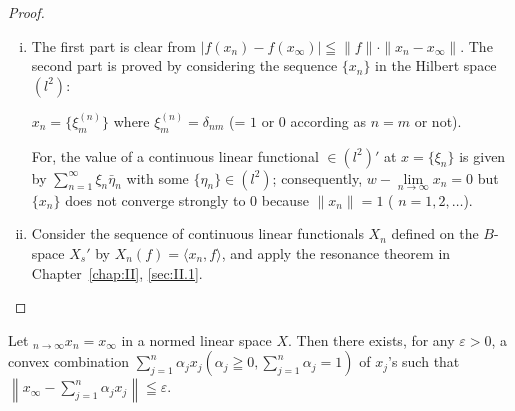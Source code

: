 \begin{proof}
 \begin{enumerate}[i)]
\item The first part is clear from $|f(x_n) - f(x_\infty)| \leqq \|f\| \cdot \|x_n - x_\infty\|$. The second part is proved by considering the sequence $\{x_n\}$ in the Hilbert space $(l^2)$: 

$x_{n} = \{\xi_{m}^{(n)}\}$ where $\xi_{m}^{(n)} = \delta_{nm}$ (= $1$ or $0$ according as $n = m$ or not). 

For, the value of a continuous linear functional $\in (l^2)'$ at $x = \{\xi_n\}$ is given by $\sum\limits_{n=1}^{\infty} \xi_n \bar{\eta}_n$ with some $\{\eta_n\} \in (l^2)$; consequently, $w - \lim\limits_{n \to \infty} x_n = 0$ but $\{x_n\}$ does not converge strongly to $0$ because $\|x_n\| = 1$ ( $n = 1, 2, \ldots$).
\item Consider the sequence of continuous linear functionals $X_n$ defined on the $B$-space $X_s'$ by $X_n(f) = \langle x_n, f \rangle$, and apply the resonance theorem in Chapter~\ref{chap:II}, \ref{sec:II.1}. \qedhere
\end{enumerate}
\end{proof}

\begin{theorem}\label{thm:V.1.Theorem.2} Let \wlim $_{n \to \infty} x_n = x_\infty$ in a normed linear space $X$. Then there exists, for any $\varepsilon > 0$, a convex combination $\sum\limits_{j=1}^{n} \alpha_j x_j \left( \alpha_j \geqq 0, \sum\limits_{j=1}^{n} \alpha_j = 1 \right)$ of $x_j$'s such that $\left\| x_\infty - \sum\limits_{j=1}^{n} \alpha_j x_j \right\| \leqq \varepsilon$. 
\end{theorem}

